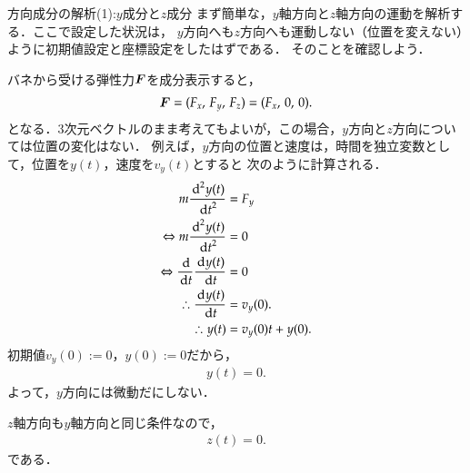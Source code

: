     \begin{mysmallsec}{方向成分の解析(1):$y$成分と$z$成分}
        まず簡単な，$y$軸方向と$z$軸方向の運動を解析する．ここで設定した状況は，
        $y$方向へも$z$方向へも運動しない（位置を変えない）ように初期値設定と座標設定をしたはずである．
        そのことを確認しよう．

        バネから受ける弾性力$\boldsymbol{F}$を成分表示すると，
            \begin{align}
                \boldsymbol{F} = ({F}_{x}, \, {F}_{y}, \, {F}_{z}) = ({F}_{x},\,0,\,0).
            \end{align}
        となる．3次元ベクトルのまま考えてもよいが，この場合，$y$方向と$z$方向については位置の変化はない．
        例えば，$y$方向の位置と速度は，時間を独立変数として，位置を$y(t)$，速度を${v}_{y}(t)$とすると
        次のように計算される．
            \begin{align*}
                                m\frac{{\,\mathrm{d}}^{2} y(t)}{{\,\mathrm{d} t}^{2}}      &= {F}_{y}     \\
                \Leftrightarrow m\frac{{\,\mathrm{d}}^{2} y(t)}{{\,\mathrm{d} t}^{2}}      &= 0           \\
                \Leftrightarrow  \frac{\,\mathrm{d}}{\,\mathrm{d} t}\frac{\,\mathrm{d} y(t)}{\,\mathrm{d} t} &= 0           \\
                \therefore       \frac{\,\mathrm{d} y(t)}{\,\mathrm{d} t}                  &= {v}_{y}(0). \\
                \therefore      y(t)                                     &= {v}_{y}(0)t + y(0).
            \end{align*}
        初期値${v}_{y}(0):=0$，$y(0):=0$だから，
        \begin{align}
            y(t) = 0.
        \end{align}
        よって，$y$方向には微動だにしない．

        $z$軸方向も$y$軸方向と同じ条件なので，
        \begin{align}
            z(t) = 0.
        \end{align}
        である．
    \end{mysmallsec}

